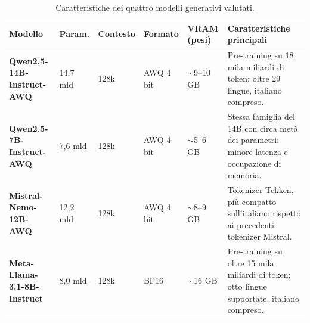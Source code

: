 \begin{table}[H]
    \centering
    \footnotesize
    \setlength{\tabcolsep}{4pt}
    \renewcommand{\arraystretch}{1.35}
    \begin{tabularx}{\textwidth}{@{} L{3.4cm} C{1.2cm} C{1.6cm} C{1.4cm} C{1.4cm} >{\raggedright\arraybackslash}X @{}}
        \toprule
        \textbf{Modello} & \textbf{Param.} & \textbf{Contesto} & \textbf{Formato} & \textbf{VRAM (pesi)} & \textbf{Caratteristiche principali} \\
        \midrule
        \textbf{Qwen2.5-14B-Instruct-AWQ}
            & 14,7 mld
            & 128k
            & AWQ 4 bit
            & $\sim$9--10 GB
            & Pre-training su 18 mila miliardi di token; oltre 29 lingue, italiano compreso. \\
        \midrule
        \textbf{Qwen2.5-7B-Instruct-AWQ}
            & 7,6 mld
            & 128k
            & AWQ 4 bit
            & $\sim$5--6 GB
            & Stessa famiglia del 14B con circa metà dei parametri: minore latenza e occupazione di memoria. \\
        \midrule
        \textbf{Mistral-Nemo-12B-AWQ}
            & 12,2 mld
            & 128k
            & AWQ 4 bit
            & $\sim$8--9 GB
            & Tokenizer Tekken, più compatto sull'italiano rispetto ai precedenti tokenizer Mistral. \\
        \midrule
        \textbf{Meta-Llama-3.1-8B-Instruct}
            & 8,0 mld
            & 128k
            & BF16 \newline
            & $\sim$16 GB
            & Pre-training su oltre 15 mila miliardi di token; otto lingue supportate, italiano compreso. \\
        \bottomrule
    \end{tabularx}
    \caption{Caratteristiche dei quattro modelli generativi valutati.}
    \label{tab:llm_comparison}
\end{table}